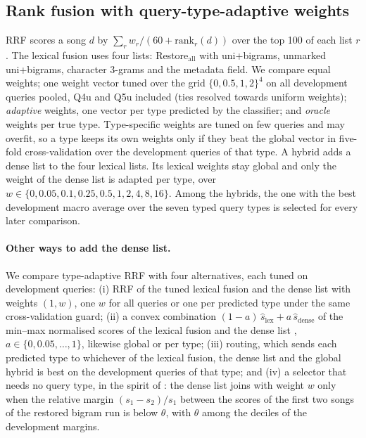 \documentclass[11pt]{article}
\newcommand{\Qfouru}{Q4u\xspace}
\newcommand{\Qfiveu}{Q5u\xspace}
\begin{document}
\subsection{Rank fusion with query-type-adaptive weights}\label{sec:fusion}
RRF \citep{cormack2009rrf} scores a song $d$ by $\sum_r w_r / (60 + \mathrm{rank}_r(d))$ over the top 100
of each list $r$. The lexical fusion uses four lists: Restore$_{\mathrm{all}}$ with uni+bigrams, unmarked
uni+bigrams, character 3-grams and the metadata field. We compare equal weights; one weight vector tuned over
the grid $\{0, 0.5, 1, 2\}^4$ on all development queries pooled, \Qfouru{} and \Qfiveu{} included (ties
resolved towards uniform weights); \emph{adaptive} weights, one vector per type predicted by the classifier;
and \emph{oracle} weights per true type. Type-specific weights are tuned on few queries and may overfit, so a
type keeps its own weights only if they beat the global vector in five-fold cross-validation over the
development queries of that type. A hybrid adds a dense list to the four lexical lists. Its lexical weights
stay global and only the weight of the dense list is adapted per type, over
$w \in \{0, 0.05, 0.1, 0.25, 0.5, 1, 2, 4, 8, 16\}$. Among the hybrids, the one with the best development macro
average over the seven typed query types is selected for every later comparison.

\paragraph{Other ways to add the dense list.} We compare type-adaptive RRF with four alternatives, each tuned on
development queries: (i) RRF of the tuned lexical fusion and the dense list with weights $(1, w)$, one $w$ for
all queries or one per predicted type under the same cross-validation guard; (ii) a convex combination
$(1-a)\,\hat s_{\mathrm{lex}} + a\,\hat s_{\mathrm{dense}}$ of the min--max normalised scores of the lexical fusion
and the dense list \citep{bruch2023fusion}, $a \in \{0, 0.05, \dots, 1\}$, likewise global or per type;
(iii) routing, which sends each predicted type to whichever of the lexical fusion, the dense list and the global
hybrid is best on the development queries of that type; and (iv) a selector that needs no query type, in the
spirit of \citet{arabzadeh2021dense}: the dense list joins with weight $w$ only when the relative margin
$(s_1 - s_2)/s_1$ between the scores of the first two songs of the restored bigram run is below $\theta$, with
$\theta$ among the deciles of the development margins.
\end{document}
